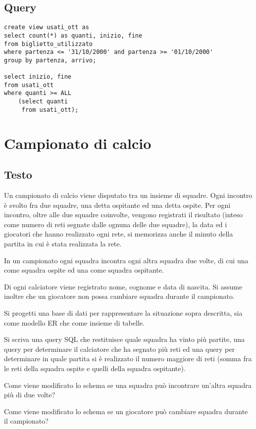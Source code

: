 \documentclass[11pt]{article}
\begin{document}
\subsection{Query}
\begin{verbatim}
create view usati_ott as
select count(*) as quanti, inizio, fine
from biglietto_utilizzato
where partenza <= '31/10/2000' and partenza >= '01/10/2000'
group by partenza, arrivo;

select inizio, fine
from usati_ott
where quanti >= ALL
    (select quanti
     from usati_ott);
\end{verbatim}

\newpage
\section{Campionato di calcio}

\subsection{Testo}
Un campionato di calcio viene disputato tra un insieme di squadre. Ogni incontro \`e svolto
fra due squadre, una detta ospitante ed una detta ospite. Per ogni incontro, oltre alle
due squadre coinvolte, vengono registrati il risultato (inteso come numero di reti segnate
dalle ognuna delle due squadre), la data ed i giocatori che hanno
realizzato ogni rete, si memorizza anche il minuto della partita in cui \`e stata
realizzata la rete.

In un campionato ogni squadra incontra ogni altra squadra due volte, di cui una come
squadra ospite ed una come squadra ospitante.

Di ogni calciatore viene registrato nome, cognome e data di nascita. Si assume inoltre che
un giocatore non possa cambiare squadra durante il campionato.

Si progetti una base di dati per rappresentare la situazione sopra descritta, sia come
modello ER che come insieme di tabelle.

Si scriva una query SQL che restituisce quale squadra ha vinto pi\`u partite, una
query per determinare il calciatore che ha segnato pi\`u reti ed una query per
determinare in  quale partita si \`e realizzato il numero maggiore di reti (somma
fra le reti della squadra ospite e quelli della squadra ospitante).


Come viene modificato lo schema se una squadra pu\`o incontrare un'altra squadra
pi\`u di due volte?

Come viene modificato lo schema se un giocatore pu\`o cambiare squadra durante il
campionato?
\end{document}
